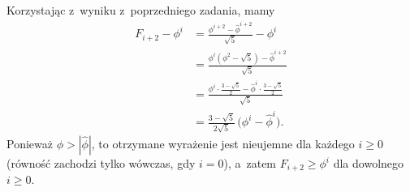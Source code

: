 \exercise %
Korzystając z~wyniku z~poprzedniego zadania, mamy
\begin{align*}
    F_{i+2}-\phi^i &= \frac{\phi^{i+2}-\widehat\phi^{i+2}}{\sqrt{5}}-\phi^i \\[1mm]
	&= \frac{\phi^i(\phi^2-\sqrt{5})-\widehat\phi^{i+2}}{\sqrt{5}} \\[1mm]
	&= \frac{\phi^i\cdot\frac{3-\sqrt{5}}{2}-\widehat\phi^i\cdot\frac{3-\sqrt{5}}{2}}{\sqrt{5}} \\
	&= \frac{3-\sqrt{5}}{2\sqrt{5}}\,\bigl(\phi^i-\widehat\phi^i\bigr).
\end{align*}
Ponieważ $\phi>|\widehat\phi|$, to otrzymane wyrażenie jest nieujemne dla każdego $i\ge0$ (równość zachodzi tylko wówczas, gdy $i=0$), a~zatem $F_{i+2}\ge\phi^i$ dla dowolnego $i\ge0$.
